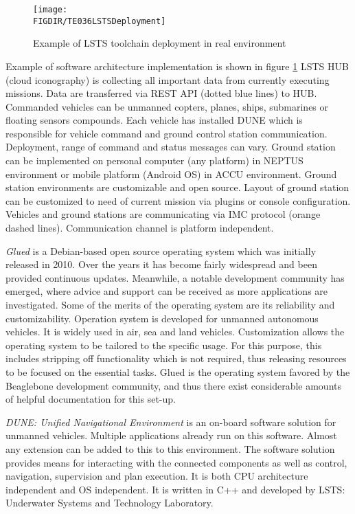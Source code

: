 \begin{figure}[H]
    \centering
    \texttt{[image: \\FIGDIR/TE036LSTSDeployment]}
    \caption{Example of LSTS toolchain deployment in real environment \cite{pinto2006neptus}}
    \label{fig:lstsdeployment}
\end{figure}

Example of software architecture implementation is shown in figure \ref{fig:lstsdeployment} LSTS HUB (cloud iconography) is collecting all important data from currently executing missions. Data are transferred via REST API (dotted blue lines) to HUB.  Commanded vehicles can be unmanned copters, planes, ships, submarines or floating sensors compounds. Each vehicle has installed DUNE which is responsible for vehicle command and ground control station communication. Deployment, range of command and status messages can vary. Ground station can be implemented on personal computer (any platform) in NEPTUS environment or mobile platform (Android OS) in ACCU environment. Ground station environments are customizable and open source. Layout of ground station can be customized to need of current mission via plugins or console configuration. Vehicles and ground stations are communicating via IMC protocol (orange dashed lines). Communication channel is platform independent.


\textit{Glued} is a Debian-based open source operating system which was initially released in 2010.  Over the years it has become fairly widespread and been provided continuous updates.  Meanwhile, a notable development community has emerged, where advice and support can be received as more applications are investigated. Some of the merits of the operating system are its reliability and customizability. Operation system is developed for unmanned autonomous vehicles. It is widely used in air, sea and land vehicles. Customization allows the operating system to be tailored to the specific usage. For this purpose, this includes stripping off functionality which is not required, thus releasing resources to be focused on the essential tasks. Glued is the operating system favored by the Beaglebone development community, and thus there exist considerable amounts of helpful documentation for this set-up.

\textit{DUNE: Unified Navigational Environment} is an on-board software solution for unmanned vehicles. Multiple applications already run on this software. Almost any extension can be added to this to this environment. The software solution provides means for interacting with the connected components as well as control, navigation, supervision and plan execution.  It is both CPU architecture independent and OS independent.  It is written in C++ and developed by LSTS: Underwater Systems and Technology Laboratory.

